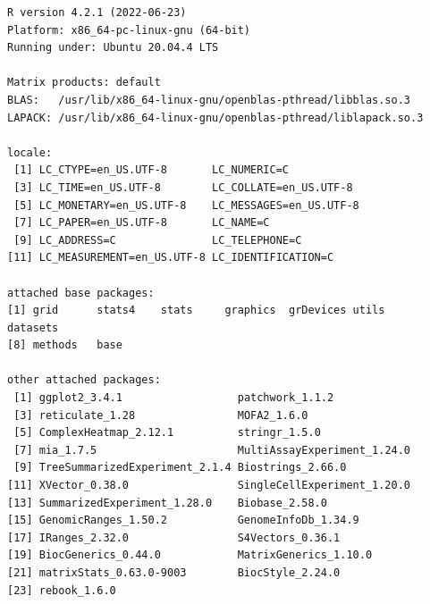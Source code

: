 \documentclass[
]{book}
\begin{document}
\begin{verbatim}
R version 4.2.1 (2022-06-23)
Platform: x86_64-pc-linux-gnu (64-bit)
Running under: Ubuntu 20.04.4 LTS

Matrix products: default
BLAS:   /usr/lib/x86_64-linux-gnu/openblas-pthread/libblas.so.3
LAPACK: /usr/lib/x86_64-linux-gnu/openblas-pthread/liblapack.so.3

locale:
 [1] LC_CTYPE=en_US.UTF-8       LC_NUMERIC=C              
 [3] LC_TIME=en_US.UTF-8        LC_COLLATE=en_US.UTF-8    
 [5] LC_MONETARY=en_US.UTF-8    LC_MESSAGES=en_US.UTF-8   
 [7] LC_PAPER=en_US.UTF-8       LC_NAME=C                 
 [9] LC_ADDRESS=C               LC_TELEPHONE=C            
[11] LC_MEASUREMENT=en_US.UTF-8 LC_IDENTIFICATION=C       

attached base packages:
[1] grid      stats4    stats     graphics  grDevices utils     datasets 
[8] methods   base     

other attached packages:
 [1] ggplot2_3.4.1                  patchwork_1.1.2               
 [3] reticulate_1.28                MOFA2_1.6.0                   
 [5] ComplexHeatmap_2.12.1          stringr_1.5.0                 
 [7] mia_1.7.5                      MultiAssayExperiment_1.24.0   
 [9] TreeSummarizedExperiment_2.1.4 Biostrings_2.66.0             
[11] XVector_0.38.0                 SingleCellExperiment_1.20.0   
[13] SummarizedExperiment_1.28.0    Biobase_2.58.0                
[15] GenomicRanges_1.50.2           GenomeInfoDb_1.34.9           
[17] IRanges_2.32.0                 S4Vectors_0.36.1              
[19] BiocGenerics_0.44.0            MatrixGenerics_1.10.0         
[21] matrixStats_0.63.0-9003        BiocStyle_2.24.0              
[23] rebook_1.6.0                  


\end{verbatim}
\end{document}
